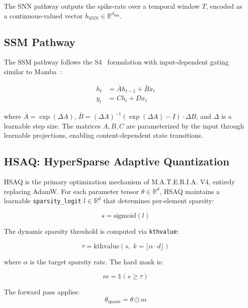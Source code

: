\documentclass[conference]{IEEEtran}
\newcommand{\materia}{\textsc{M.A.T.E.R.I.A.}}
\newcommand{\hsaq}{\textsc{HSAQ}}
\begin{document}
The SNN pathway outputs the spike-rate over a temporal window $T$, encoded as a continuous-valued vector $h_{\text{SNN}} \in \mathbb{R}^{d_{\text{snn}}}$.

\subsection{SSM Pathway}

The SSM pathway follows the S4~\cite{gu2021efficiently} formulation with input-dependent gating similar to Mamba~\cite{gu2023mamba}:

\begin{align}
h_t &= \bar{A} h_{t-1} + \bar{B} x_t \\
y_t &= C h_t + D x_t
\end{align}

where $\bar{A} = \exp(\Delta A)$, $\bar{B} = (\Delta A)^{-1}(\exp(\Delta A) - I) \cdot \Delta B$, and $\Delta$ is a learnable step size. The matrices $A, B, C$ are parameterized by the input through learnable projections, enabling content-dependent state transitions.

\subsection{\hsaq{}: HyperSparse Adaptive Quantization}

HSAQ is the primary optimization mechanism of \materia{} V4, entirely replacing AdamW. For each parameter tensor $\theta \in \mathbb{R}^{d}$, HSAQ maintains a learnable \texttt{sparsity\_logit} $l \in \mathbb{R}^{d}$ that determines per-element sparsity:

\begin{equation}
s = \text{sigmoid}(l)
\end{equation}

The dynamic sparsity threshold is computed via \texttt{kthvalue}:

\begin{equation}
\tau = \text{kthvalue}(s,\; k = \lfloor \alpha \cdot d \rfloor)
\end{equation}

where $\alpha$ is the target sparsity rate. The hard mask is:

\begin{equation}
m = \mathds{1}(s \geq \tau)
\end{equation}

The forward pass applies:
\begin{equation}
\theta_{\text{sparse}} = \theta \odot m
\end{equation}
\end{document}
